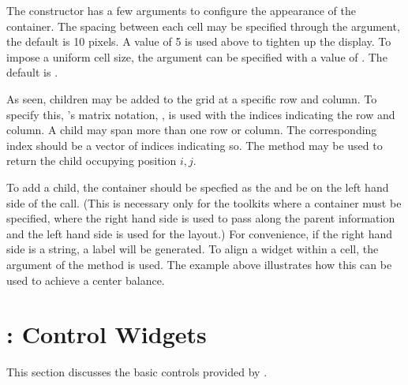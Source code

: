 The constructor has a few arguments to configure the appearance of the
container. The spacing between each cell may be specified through the
 argument, the default is 10 pixels. A
value of 5 is used above to tighten up the display.
To impose a uniform cell size, the 
argument can be specified with a value of . The default is
. 

As seen, children may be added to the grid at a specific row and
column. To specify this, \R's matrix notation, \code{[\ASSIGN}, is
used with the indices indicating the row and column.  A child may span
more than one row or column. The corresponding index should be a
vector of indices indicating so.  The \code{[} method may be used to
return the child occupying position $i,j$.


To add a child, the  container should be specfied as the
 and be on the left hand side of the \code{[\ASSIGN}
call. (This is necessary only for the toolkits where a container must
be specified, where the right hand side is used to pass along the
parent information and the left hand side is used for the layout.) For
convenience, if the right hand side is a string, a label will be
generated.  To align a widget within a cell, the
 argument of the \code{[\ASSIGN}{glayout} method
is used. The example above illustrates how this can be used to achieve
a center balance.










\chapter{: Control Widgets}
\label{cha:control-widgets}

  

  
This section discusses the basic controls provided by
.

